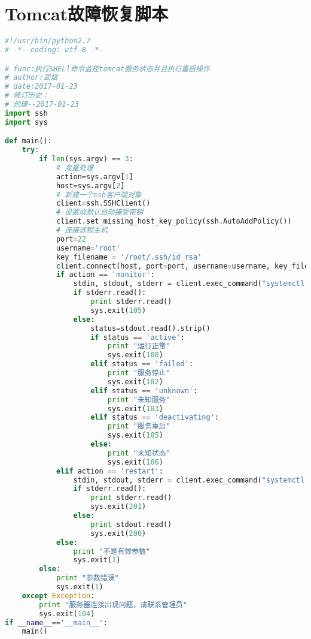 \chapter{Tomcat故障恢复脚本}
\label{cha:Tomcatfailover}
\begin{lstlisting}[language=python,numbers=none]
#!/usr/bin/python2.7
# -*- coding: utf-8 -*-

# func:执行SHELl命令监控tomcat服务状态并且执行重启操作
# author:武斌
# date:2017-01-23
# 修订历史：
# 创建--2017-01-23
import ssh
import sys

def main():
    try:
        if len(sys.argv) == 3:
            # 变量处理
            action=sys.argv[1]
            host=sys.argv[2]
            # 新建一个ssh客户端对象
            client=ssh.SSHClient()
            # 设置成默认自动接受密钥
            client.set_missing_host_key_policy(ssh.AutoAddPolicy())
            # 连接远程主机
            port=22
            username='root'
            key_filename = '/root/.ssh/id_rsa'
            client.connect(host, port=port, username=username, key_filename = key_filename)
            if action == 'monitor':
                stdin, stdout, stderr = client.exec_command("systemctl is-active tomcat.service")
                if stderr.read():
                    print stderr.read()
                    sys.exit(105)
                else:
                    status=stdout.read().strip()
                    if status == 'active':
                        print "运行正常"
                        sys.exit(100)
                    elif status == 'failed':
                        print "服务停止"
                        sys.exit(102)
                    elif status == 'unknown':
                        print "未知服务"
                        sys.exit(103)
                    elif status == 'deactivating':
                        print "服务重启"
                        sys.exit(105)
                    else:
                        print "未知状态"
                        sys.exit(106)
            elif action == 'restart':
                stdin, stdout, stderr = client.exec_command("systemctl restart tomcat.service")
                if stderr.read():
                    print stderr.read()
                    sys.exit(201)
                else:
                    print stdout.read()
                    sys.exit(200)
            else:
                print "不是有效参数"
                sys.exit(1)
        else:
            print "参数错误"
            sys.exit(1)
    except Exception:
        print "服务器连接出现问题，请联系管理员"
        sys.exit(104)
if __name__=='__main__':
    main()
\end{lstlisting}